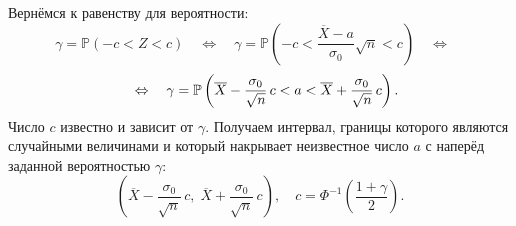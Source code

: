 \documentclass[12pt]{article}
\begin{document}
Вернёмся к равенству для вероятности:
\begin{equation*}
    \gamma = \mathbb{P}(-c < Z < c) \quad\Leftrightarrow\quad
    \gamma = \mathbb{P}\left(-c < \frac{\overline{X} - a}{\sigma_0} \sqrt{n} < c\right) \quad\Leftrightarrow\quad 
\end{equation*}
\begin{equation*}\vspace{5mm}
    \quad\Leftrightarrow\quad \gamma = \mathbb{P}\left(\overline{X} - \frac{\sigma_0}{\sqrt{n}}\,c < a < \overline{X} + \frac{\sigma_0}{\sqrt{n}}\,c\right).
\end{equation*}
Число $c$ известно и зависит от $\gamma$. Получаем интервал, границы которого являются случайными величинами и который накрывает неизвестное число $a$ с наперёд заданной вероятностью $\gamma$:\vspace{3mm}
\begin{equation*}
    \left(\overline{X} - \frac{\sigma_0}{\sqrt{n}}\,c,\; \overline{X} + \frac{\sigma_0}{\sqrt{n}}\,c\right), \quad c = \Phi^{-1}\left(\frac{1 + \gamma}{2}\right).
\end{equation*}
\end{document}
